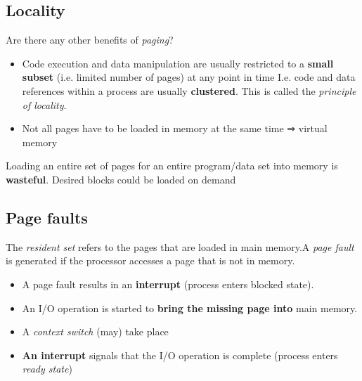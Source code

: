 \documentclass{article}
\begin{document}
\subsection{Locality}
\begin{flushleft}
Are there any other benefits of \textit{paging}?
\begin{itemize}
	\item Code execution and data manipulation are usually restricted to a \textbf{small subset} (i.e. limited number of pages) at any point in time I.e. code and data references within a process are usually \textbf{clustered}. This is called the \textit{principle of locality}.
	\item Not all pages have to be loaded in memory at the same time ⇒ virtual memory
\end{itemize}
Loading an entire set of pages for an entire program/data set into memory is \textbf{wasteful}. Desired blocks could be loaded on demand
\end{flushleft}

\subsection{Page faults}
\begin{flushleft}
The \textit{resident set} refers to the pages that are loaded in main memory.A \textit{page fault} is generated if the processor accesses a page that is not in memory.
\begin{itemize}
	\item A page fault results in an \textbf{interrupt} (process enters blocked state).
	\item An I/O operation is started to \textbf{bring the missing page into} main memory.
	\item A \textit{context switch} (may) take place
	\item \textbf{An interrupt} signals that the I/O operation is complete (process enters \textit{ready state})
\end{itemize}
\end{flushleft}
\end{document}
